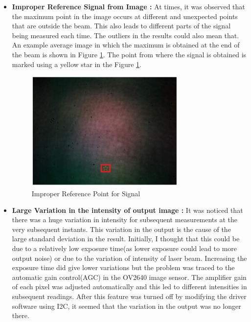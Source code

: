 \begin{itemize}
\item \textbf{Improper Reference Signal from Image :} At times, it was observed that the maximum point in the image occurs at different and unexpected points that are outside the beam. This also leads to different parts of the signal being measured each time. The outliers in the results could also mean that. An example average image in which the maximum is obtained at the end of the beam is shown in Figure \ref{fig:exp_acc_improper}. The point from where the signal is obtained is marked using a yellow star in the Figure \ref{fig:exp_acc_improper}.
\begin{figure}[ht]
\centering
\includegraphics[width = 0.75\textwidth]{pics/ImproperDetection}
\caption{Improper Reference Point for Signal}
\label{fig:exp_acc_improper}
\end{figure}
\item \textbf{Large Variation in the intensity of output image :} It was noticed that there was a huge variation in intensity for subsequent measurements at the very subsequent instants. This variation in the output is the cause of the large standard deviation in the result. Initially, I thought that this could be due to a relatively low exposure time(as lower exposure could lead to more output noise) or due to the variation of intensity of laser beam. Increasing the exposure time did give lower variations but the problem was traced to the automatic gain control(AGC) in the OV2640 image sensor. The amplifier gain of each pixel was adjusted automatically and this led to different intensities in subsequent readings. After this feature was turned off by modifying the driver software using I2C, it seemed that the variation in the output was no longer there.


\end{itemize}
